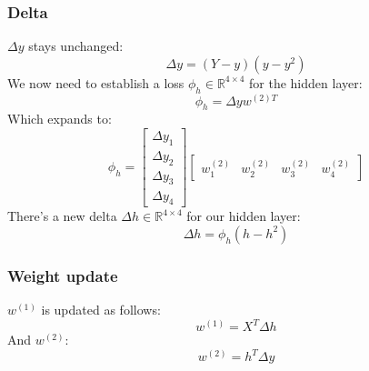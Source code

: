 \documentclass[10pt,a4paper]{article}
\begin{document}
\subsubsection{Delta}
$\Delta{y}$ stays unchanged:
\begin{equation}
	\Delta{y} = (Y-y)(y-y^2)
\end{equation}
We now need to establish a loss $\phi_h \in \mathbb{R}^{4 \times 4}$ for the hidden layer:
\begin{equation}
	\phi_h = \Delta{y}w^{(2)T}
\end{equation}
Which expands to:
\begin{equation}
	\phi_h =
	\begin{bmatrix}
		\Delta{y_1} \\
		\Delta{y_2} \\
		\Delta{y_3} \\
		\Delta{y_4}
	\end{bmatrix}
	\begin{bmatrix}
		w^{(2)}_{1} & w^{(2)}_{2} & w^{(2)}_{3} & w^{(2)}_{4}
	\end{bmatrix}
\end{equation}
There's a new delta $\Delta{h} \in \mathbb{R}^{4 \times 4}$ for our hidden layer:
\begin{equation}
	\Delta{h} = \phi_h (h-h^2)
\end{equation}

\subsubsection{Weight update}
$w^{(1)}$ is updated as follows:
\begin{equation}
	w^{(1)} = X^T\Delta{h}
\end{equation}
And $w^{(2)}$:
\begin{equation}
	w^{(2)} = h^T\Delta{y}
\end{equation}
\end{document}
